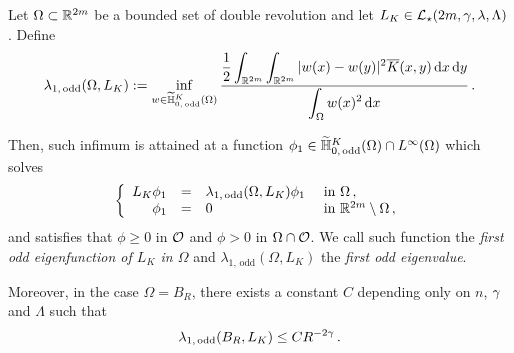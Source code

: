 \begin{lemma}
	\label{Lemma:FirstOddEigenfunction}
	Let $\Omega\subset \mathbb{R}^{2m} $ be a bounded set of double revolution and let $L_K\in \mathcal{L}_\star(2m,\gamma,\lambda, \Lambda)$. Define 
	\begin{equation}
	\label{Eq:DefLambda1}
	\lambda_{1, \, \mathrm{odd}}(\Omega, L_K) := \inf_{w \in \widetilde{\mathbb{H}}^K_{0, \, \mathrm{odd}}(\Omega)} \dfrac{\dfrac{1}{2}  \displaystyle\int_{\mathbb{R}^{2m}} \int_{\mathbb{R}^{2m}} |w(x) - w(y)|^2 \overline{K}(x,y) \,\mathrm{d} x \,\mathrm{d} y}{ \displaystyle \int_\Omega w(x)^2 \,\mathrm{d} x}\,.
	\end{equation}
	
	Then, such infimum is attained at a function $\phi_1\in \widetilde{\mathbb{H}}^K_{0, \, \mathrm{odd}}(\Omega)\cap L^\infty(\Omega)$ which solves
	$$
	\left\{\begin{array}{rcll}
	L_K \phi_1 &=& \lambda_{1, \, \mathrm{odd}}(\Omega, L_K) \phi_1 & \textrm{ in } \Omega\,,\\
	\phi_1 & = & 0 & \textrm{ in } \mathbb{R}^{2m}\setminus \Omega\,,
	\end{array} \right.
	$$
	and satisfies that $\phi \geq 0$ in $\mathcal{O}$ and $\phi > 0$ in $\Omega \cap \mathcal{O}$.
	We call such function the \emph{first odd eigenfunction of $L_K$ in $\Omega$} and $\lambda_{1, \, \mathrm{odd}}(\Omega, L_K) $ the \emph{first odd eigenvalue}. 
	
	Moreover, in the case $\Omega = B_R$, there exists a constant $C$ depending only on $n$, $\gamma$ and $\Lambda$ such that
	$$
	\lambda_{1, \, \mathrm{odd}}(B_R, L_K) \leq C R^{-2\gamma}\,. 
	$$ 
\end{lemma}


